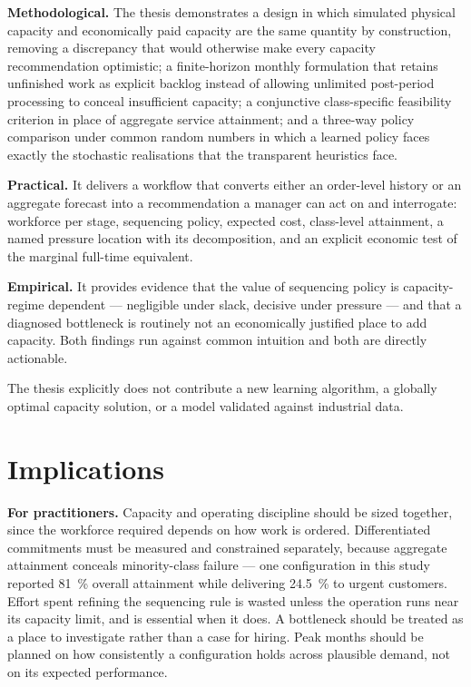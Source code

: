 \textbf{Methodological.} The thesis demonstrates a design in which simulated physical capacity
and economically paid capacity are the same quantity by construction, removing a discrepancy
that would otherwise make every capacity recommendation optimistic; a finite-horizon monthly
formulation that retains unfinished work as explicit backlog instead of allowing unlimited
post-period processing to conceal insufficient capacity; a conjunctive class-specific
feasibility criterion in place of aggregate service attainment; and a three-way policy
comparison under common random numbers in which a learned policy faces exactly the stochastic
realisations that the transparent heuristics face.

\textbf{Practical.} It delivers a workflow that converts either an order-level history or an
aggregate forecast into a recommendation a manager can act on and interrogate: workforce per
stage, sequencing policy, expected cost, class-level attainment, a named pressure location with
its decomposition, and an explicit economic test of the marginal full-time equivalent.

\textbf{Empirical.} It provides evidence that the value of sequencing policy is
capacity-regime dependent --- negligible under slack, decisive under pressure --- and that a
diagnosed bottleneck is routinely not an economically justified place to add capacity. Both
findings run against common intuition and both are directly actionable.

The thesis explicitly does not contribute a new learning algorithm, a globally optimal capacity
solution, or a model validated against industrial data.

\section{Implications}
\label{sec:implications}

\textbf{For practitioners.} Capacity and operating discipline should be sized together, since
the workforce required depends on how work is ordered. Differentiated commitments must be
measured and constrained separately, because aggregate attainment conceals minority-class
failure --- one configuration in this study reported \SI{81}{\percent} overall attainment while
delivering \SI{24.5}{\percent} to urgent customers. Effort spent refining the sequencing rule is
wasted unless the operation runs near its capacity limit, and is essential when it does. A
bottleneck should be treated as a place to investigate rather than a case for hiring. Peak
months should be planned on how consistently a configuration holds across plausible demand, not on
its expected performance.

